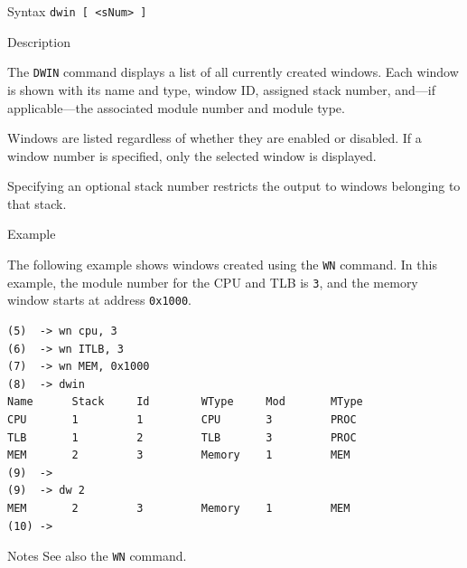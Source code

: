 %
%
\pagebreak
{}

\begin{iPageDescEntry}{Syntax}
\texttt{dwin [ <sNum> ]}
\end{iPageDescEntry}

\begin{iPageDescEntry}{Description}

The \texttt{DWIN} command displays a list of all currently created windows.
Each window is shown with its name and type, window ID, assigned stack number,
and—if applicable—the associated module number and module type.

Windows are listed regardless of whether they are enabled or disabled.
If a window number is specified, only the selected window is displayed.

Specifying an optional stack number restricts the output to windows belonging
to that stack.

\end{iPageDescEntry}

\begin{iPageDescOpEntry}{Example}

The following example shows windows created using the \texttt{WN} command.
In this example, the module number for the CPU and TLB is \texttt{3}, and the
memory window starts at address \texttt{0x1000}.

\begin{lstlisting}[style=iPageOpStyle]
(5)  -> wn cpu, 3
(6)  -> wn ITLB, 3
(7)  -> wn MEM, 0x1000
(8)  -> dwin
Name      Stack     Id        WType     Mod       MType     
CPU       1         1         CPU       3         PROC      
TLB       1         2         TLB       3         PROC      
MEM       2         3         Memory    1         MEM       
(9)  ->
(9)  -> dw 2
MEM       2         3         Memory    1         MEM 
(10) ->
\end{lstlisting}

\end{iPageDescOpEntry}

\begin{iPageDescEntry}{Notes}
See also the \texttt{WN} command.
\end{iPageDescEntry}
